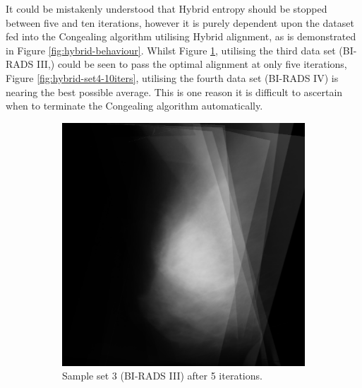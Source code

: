 It could be mistakenly understood that Hybrid entropy should be stopped between five and ten iterations, however it is purely dependent upon the dataset fed into the \Gls{Congealing} algorithm utilising Hybrid alignment, as is demonstrated in Figure \ref{fig:hybrid-behaviour}. Whilst Figure \ref{fig:hybrid-set3-5iters}, utilising the third data set (BI-RADS III,) could be seen to pass the optimal alignment at only five iterations, Figure \ref{fig:hybrid-set4-10iters}, utilising the fourth data set (BI-RADS IV) is nearing the best possible average. This is one reason it is difficult to ascertain when to terminate the \Gls{Congealing} algorithm automatically.

\begin{figure}[H]
    \centering
    \begin{subfigure}[t]{0.4\textwidth}
      \includegraphics[width=\textwidth]{Appendix5/sample3/hybrid/5_hybrid.png}
        \caption{Sample set 3 (BI-RADS III) after 5 iterations.}
        \label{fig:hybrid-set3-5iters}
    \end{subfigure} \hfill
    \begin{subfigure}[t]{0.4\textwidth}

\end{subfigure}
\end{figure}
